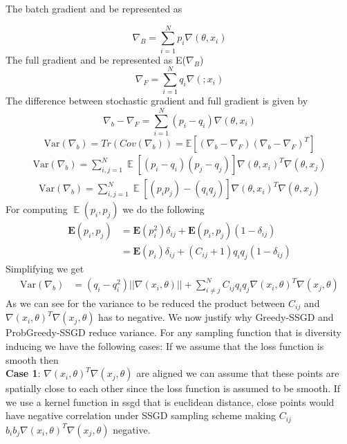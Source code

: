 \documentclass[a4paper,twoside]{iiththesis}
\theoremstyle{definition}
\theoremstyle{definition}
\theoremstyle{remark}
\DeclareMathOperator*{\E}{\mathop{\mathbb{E}}}
\begin{document}
The batch gradient and be represented as 


\begin{equation}
\nabla_{B} = \sum_{i=1}^{N} p_i \nabla(\theta, x_i)
\end{equation}
The full gradient and be represented as E($\nabla_B$)
\begin{equation}
\nabla_{F} = \sum_{i=1}^{N} q_i \nabla(; x_i)
\end{equation}
The difference between stochastic gradient and full gradient is given by
\begin{equation}
\nabla_{b} - \nabla_{F} = \sum_{i=1}^{N}(p_i - q_i) \nabla(\theta, x_i)
\end{equation}
\begin{equation}
\text{Var}(\nabla_b) = Tr(Cov(\nabla_b)) = \mathbb{E}[(\nabla_b - \nabla_F)(\nabla_b - \nabla_F)^T] 
\end{equation}
\begin{align}
\text{Var}(\nabla_b) = \sum_{i, j =1}^N \E\left[(p_i - q_i)(p_j - q_j)\right] \nabla(\theta, x_i)^T \nabla(\theta, x_j)
\end{align}
\begin{align}
\text{Var}(\nabla_b) = \sum_{i, j=1}^N \E[(p_i p_j) - (q_i q_j)] \nabla(\theta, x_i)^T \nabla(\theta, x_j)
\end{align}
For computing $\E(p_i, p_j)$ we do the following 
\begin{align}
\mathbf{E}(p_i, p_j) &= \mathbf{E}(p_i^2)\delta_{ij} + \mathbf{E}(p_i, p_j) (1-\delta_{ij})\\
&= \mathbf{E}(p_i)\delta_{ij} + (C_{ij} + 1) q_i q_j (1-\delta_{ij})
\end{align}Simplifying we get
\begin{align}
\text{Var}(\nabla_b) &= (q_i - q_i^2) ||\nabla(x_i, \theta)||  +  \sum_{i \neq j}^N C_{ij} q_i q_j \nabla(x_i, \theta)^T \nabla(x_j, \theta)
\end{align}
As we can see for the variance to be reduced the product between $C_{ij}$ and $\nabla(x_i, \theta)^T \nabla(x_j, \theta)$ has to negative. We now justify why Greedy-SSGD and ProbGreedy-SSGD reduce variance. For any sampling function that is diversity inducing we have the following cases: If we assume that the loss function is smooth then \\
\textbf{Case 1}: $\nabla(x_i, \theta)^T \nabla(x_j, \theta)$ are aligned  we can assume that these points are spatially close to each other since the loss function is assumed to be smooth. If we use a kernel function in ssgd that is euclidean distance, close points would have negative correlation under SSGD sampling scheme making $C_{ij}$ $b_i b_j \nabla(x_i, \theta)^T \nabla(x_j, \theta)$ negative.
\end{document}
